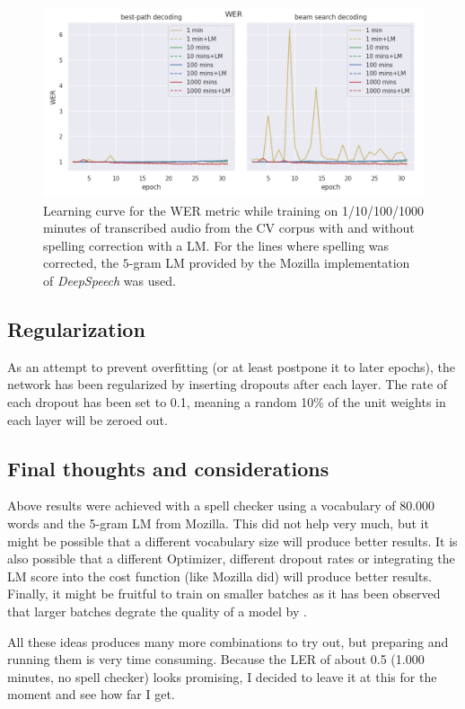 \begin{figure}[h!]
	\includegraphics[width=\linewidth]{./img/lc_wer_cv.png}
	\caption{Learning curve for the \ac{WER} metric while training on 1/10/100/1000 minutes of transcribed audio from the \ac{CV} corpus with and without spelling correction with a \ac{LM}. For the lines where spelling was corrected, the $5$-gram \ac{LM} provided by the Mozilla implementation of \textit{DeepSpeech} was used.}
	\label{lc_wer_cv}
\end{figure}

\subsection{Regularization}
As an attempt to prevent overfitting (or at least postpone it to later epochs), the network has been regularized by inserting dropouts after each layer. The rate of each dropout has been set to 0.1, meaning a random 10\% of the unit weights in each layer will be zeroed out.

\subsection{Final thoughts and considerations}

Above results were achieved with a spell checker using a vocabulary of 80.000 words and the 5-gram \ac{LM} from Mozilla. This did not help very much, but it might be possible that a different vocabulary size will produce better results. It is also possible that a different Optimizer, different dropout rates or integrating the \ac{LM} score into the cost function (like Mozilla did) will produce better results. Finally, it might be fruitful to train on smaller batches as it has been observed that larger batches degrate the quality of a model by \cite{batch_size_rnn}. 

All these ideas produces many more combinations to try out, but preparing and running them is very time consuming. Because the \ac{LER} of about 0.5 (1.000 minutes, no spell checker) looks promising, I decided to leave it at this for the moment and see how far I get.

%
%


